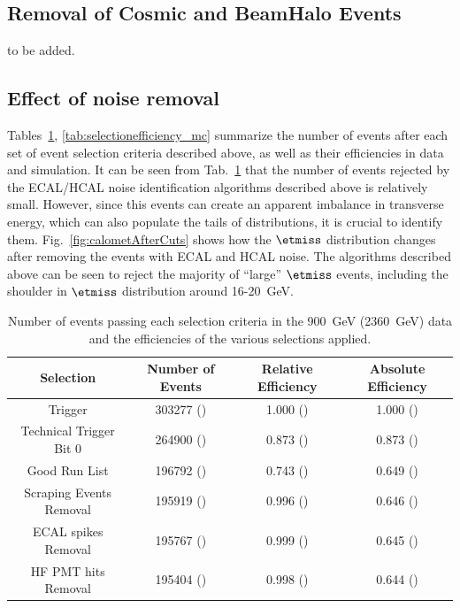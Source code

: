 \subsection{Removal of Cosmic and BeamHalo Events}
to be added.

\subsection{Effect of noise removal}

Tables~\ref{tab:selectionefficiency_data}, \ref{tab:selectionefficiency_mc}
summarize the number of events after each set of event selection
criteria described above, as well as their efficiencies in data and
simulation. It can be seen from 
Tab.~\ref{tab:selectionefficiency_data} that the number of events
rejected by the ECAL/HCAL noise identification algorithms described
above is relatively small. However, since this
events can create an apparent imbalance in transverse energy, which can
also populate the tails of distributions, it is crucial to identify
them. Fig.~\ref{fig:calometAfterCuts} shows how the
$\etmiss$ distribution changes after removing the events with ECAL and HCAL
noise. The algorithms described above can be seen to reject the majority of
``large'' $\etmiss$ events, including the shoulder in $\etmiss$
distribution around 16-20~GeV.
 
\begin{table}[!ht]
  \begin{center}
    \begin{tabular}{|c|c|c|c|}
      \hline
      Selection      & Number of Events  & Relative Efficiency   &
      Absolute Efficiency\\
      \hline\hline
      Trigger                            & 303277 () & 1.000 ()  &  1.000 () \\ 
      Technical Trigger Bit 0    & 264900 () & 0.873  () & 0.873  ()\\
      Good Run List                 & 196792 () & 0.743 () & 0.649 () \\
      Scraping Events Removal& 195919 () & 0.996 () & 0.646 () \\
      ECAL spikes Removal     & 195767 () & 0.999 () & 0.645 () \\
      HF PMT hits Removal      & 195404 () & 0.998 () & 0.644 ()\\  \hline
  \end{tabular}
    \caption{Number of events passing each selection criteria in the 900~GeV (2360~GeV) data and
      the efficiencies of the various selections applied.}
    \label{tab:selectionefficiency_data}
  \end{center}
\end{table}

